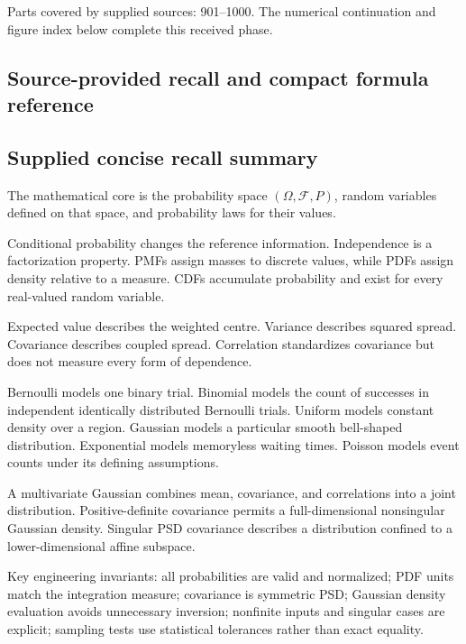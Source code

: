 Parts covered by supplied sources: 901--1000. The numerical continuation and figure index below complete this received phase.

\subsection{Source-provided recall and compact formula reference}\label{appendix-cb5af353ef77-source-provided-recall-and-compact-formula-reference}

\hypertarget{appendix-cb5af353ef77-source-provided-recall-and-compact-formula-reference}{}

\subsection{Supplied concise recall summary}\label{appendix-cb5af353ef77-supplied-concise-recall-summary}

\hypertarget{appendix-cb5af353ef77-supplied-concise-recall-summary}{}

The mathematical core is the probability space \((\Omega,\mathcal F,P)\), random variables defined on that space, and probability laws for their values.

Conditional probability changes the reference information. Independence is a factorization property. PMFs assign masses to discrete values, while PDFs assign density relative to a measure. CDFs accumulate probability and exist for every real-valued random variable.

Expected value describes the weighted centre. Variance describes squared spread. Covariance describes coupled spread. Correlation standardizes covariance but does not measure every form of dependence.

Bernoulli models one binary trial. Binomial models the count of successes in independent identically distributed Bernoulli trials. Uniform models constant density over a region. Gaussian models a particular smooth bell-shaped distribution. Exponential models memoryless waiting times. Poisson models event counts under its defining assumptions.

A multivariate Gaussian combines mean, covariance, and correlations into a joint distribution. Positive-definite covariance permits a full-dimensional nonsingular Gaussian density. Singular PSD covariance describes a distribution confined to a lower-dimensional affine subspace.

Key engineering invariants: all probabilities are valid and normalized; PDF units match the integration measure; covariance is symmetric PSD; Gaussian density evaluation avoids unnecessary inversion; nonfinite inputs and singular cases are explicit; sampling tests use statistical tolerances rather than exact equality.


